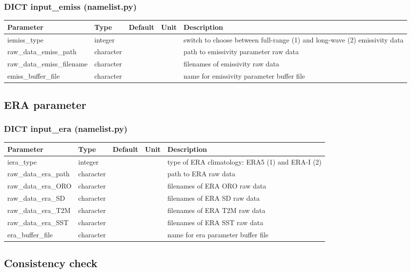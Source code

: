\documentclass[a4paper,10pt,DIV14,BCOR1cm,titlepage,twoside]{scrartcl}
\providecommand{\tabularnewline}{\\}
\begin{document}
\subsubsection*{DICT input\_emiss (namelist.py)}

\begin{longtable}{|p{4cm}|p{1.5cm}|p{1.5cm}|p{1cm}|p{6cm}|}
\hline 
\textbf{Parameter}& \textbf{Type}& \textbf{Default}& \textbf{Unit}& \textbf{Description}
\tabularnewline
\hline
\endhead
\hline
iemiss\_type & integer & &  & switch to choose between full-range (1) and long-wave (2) emissivity data \tabularnewline
\hline
raw\_data\_emiss\_path & character & &  & path to emissivity parameter raw data
\tabularnewline
\hline
raw\_data\_emiss\_filename & character & &  &  filenames of emissivity raw data
\tabularnewline
\hline
emiss\_buffer\_file & character & &  & name for emissivity parameter buffer file
\tabularnewline
\hline 
\bottomrule
\end{longtable}

\subsection{ERA parameter}\label{namelist_input_for_extpar_era}

\subsubsection*{DICT input\_era (namelist.py)}

\begin{longtable}{|p{4cm}|p{1.5cm}|p{1.5cm}|p{1cm}|p{6cm}|}
\hline 
\textbf{Parameter}& \textbf{Type}& \textbf{Default}& \textbf{Unit}& \textbf{Description}
\tabularnewline
\hline
\endhead
\hline
iera\_type & integer & &  & type of ERA climatology: ERA5 (1) and ERA-I (2)
\tabularnewline
\hline
raw\_data\_era\_path & character & &  & path to ERA  raw data
\tabularnewline
\hline
raw\_data\_era\_ORO & character & &  &  filenames of ERA ORO raw data
\tabularnewline
\hline
raw\_data\_era\_SD & character & &  &  filenames of ERA SD raw data
\tabularnewline
\hline
raw\_data\_era\_T2M & character & &  &  filenames of ERA T2M raw data
\tabularnewline
\hline
raw\_data\_era\_SST & character & &  &  filenames of ERA SST raw data
\tabularnewline
\hline
era\_buffer\_file & character & &  & name for era parameter buffer file
\tabularnewline
\hline 
\bottomrule
\end{longtable}

\subsection{Consistency check}\label{namelist_input_for_extpar_consistency_check}
\end{document}
